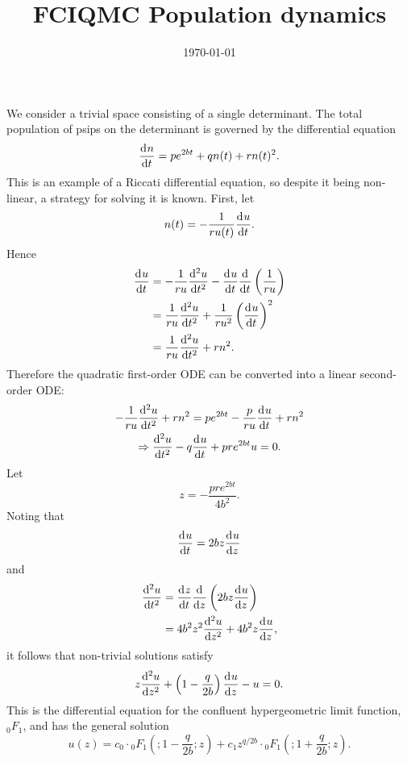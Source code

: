 \documentclass[a4paper, 11pt]{article}
\newcommand{\dd}[3][\null]{\frac{\mathrm{d}^{#1}{#2}}{\mathrm{d}{#3}^{#1}}}
\newcommand{\hyperF}[2]{{_0}F_1\left(;#1;#2\right)}
\begin{document}
\title{FCIQMC Population dynamics} 
\date{\today} \maketitle

We consider a trivial space consisting of a single determinant.  The total population of psips on the determinant is governed by the differential equation
\begin{equation}
\dd{n}{t} = p e^{2bt} + q n(t) + r n(t)^2. \label{eqn:dynamics}
\end{equation}
This is an example of a Riccati differential equation, so despite it being non-linear, a strategy for solving it is known.  First, let
\begin{equation}
n(t) = - \frac{1}{r u(t)} \dd{u}{t}.
\end{equation}
Hence
\begin{align}
\dd{u}{t} &= -\frac{1}{r u} \dd[2]{u}{t} - \dd{u}{t}\dd{\null}{t}\left(\frac{1}{r u}\right) \\
          &= \frac{1}{r u} \dd[2]{u}{t} + \frac{1}{r u^2} \left(\dd{u}{t}\right)^2 \\
          &= \frac{1}{r u} \dd[2]{u}{t} + r n^2.
\end{align}
Therefore the quadratic first-order ODE can be converted into a linear second-order ODE:
\begin{gather}
- \frac{1}{r u} \dd[2]{u}{t} + r n^2 = p e^{2bt} - \frac{p}{ru} \dd{u}{t} + rn^2 \\
\Rightarrow \dd[2]{u}{t} - q\dd{u}{t} + pre^{2bt} u = 0.
\end{gather}
Let
\begin{equation}
z = -\frac{pre^{2bt}}{4b^2}.
\end{equation}
Noting that
\begin{equation}
\dd{u}{t} = 2bz \dd{u}{z}
\end{equation}
and
\begin{align}
\dd[2]{u}{t} &= \dd{z}{t} \dd{\null}{z}\left(2bz\dd{u}{z}\right) \\
             &= 4 b^2 z^2 \dd[2]{u}{z} + 4 b^2 z \dd{u}{z},
\end{align}
it follows that non-trivial solutions satisfy
\begin{equation}
z \dd[2]{u}{z} + \left(1-\frac{q}{2b}\right)\dd{u}{z} - u = 0.
\end{equation}
This is the differential equation for the confluent hypergeometric limit function, ${_0}F_1$, and has the general solution
\begin{equation}
u(z) = c_0\cdot\hyperF{1-\frac{q}{2b}}{z} + c_1 z^{q/2b}\cdot\hyperF{1+\frac{q}{2b}}{z}.
\end{equation}
\end{document}
